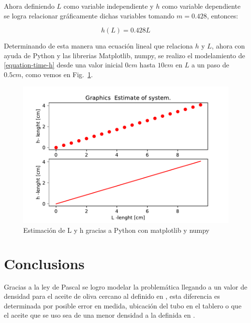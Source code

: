 Ahora definiendo $L$ como variable independiente y $h$ como variable dependiente se logra relacionar gráficamente dichas variables tomando $m = 0.428$, entonces:

\begin{equation}
\label{equation-time-h}
    h(L) = 0.428L    
\end{equation}

Determinando de esta manera una ecuación lineal que relaciona $h$ y $L$, ahora con ayuda de Python y las librerias Matplotlib, numpy,  se realizo el modelamiento de \ref{equation-time-h} desde una valor inicial $0cm$ hasta $10cm$ en $L$ a un paso de $0.5cm$, como vemos en Fig.~\ref{stimate-system}.

\begin{figure}[htbp]
  \begin{center}
  \includegraphics[scale=0.6]{pdf/plot-2-estimate-L.pdf}
  \caption{Estimación de L y h gracias a Python con matplotlib y numpy}\label{stimate-system}
  \end{center}
\end{figure}
    

\section{Conclusions}

Gracias a la ley de Pascal se logro modelar la problemática llegando a un valor de densidad para el aceite de oliva cercano al definido en \cite{density-oil}, esta diferencia es determinada por posible error en medida, ubicación del tubo en el tablero o que el aceite que se uso sea de una menor densidad a la definida en \cite{density-oil}.

